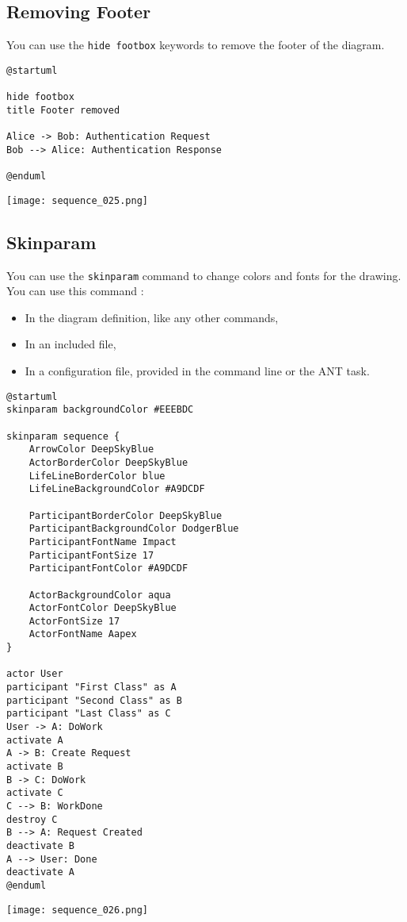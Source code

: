 \newpage \subsection{Removing Footer}

You can use the \texttt{hide footbox} keywords to remove the footer of the
diagram.
\begin{lstlisting}
@startuml

hide footbox
title Footer removed

Alice -> Bob: Authentication Request
Bob --> Alice: Authentication Response

@enduml
\end{lstlisting}
\begin{center}
\texttt{[image: sequence\_025.png]}
\end{center}


\newpage \subsection{Skinparam}

You can use the \texttt{skinparam} command to change colors and fonts for the drawing.
You can use this command :

\begin{itemize}
\item In the diagram definition, like any other commands,
\item In an included file,
\item In a configuration file, provided in the command line or the ANT task.
\end{itemize}

\begin{lstlisting}
@startuml
skinparam backgroundColor #EEEBDC

skinparam sequence {
	ArrowColor DeepSkyBlue
	ActorBorderColor DeepSkyBlue
	LifeLineBorderColor blue
	LifeLineBackgroundColor #A9DCDF
	
	ParticipantBorderColor DeepSkyBlue
	ParticipantBackgroundColor DodgerBlue
	ParticipantFontName Impact
	ParticipantFontSize 17
	ParticipantFontColor #A9DCDF
	
	ActorBackgroundColor aqua
	ActorFontColor DeepSkyBlue
	ActorFontSize 17
	ActorFontName Aapex
}

actor User
participant "First Class" as A
participant "Second Class" as B
participant "Last Class" as C
User -> A: DoWork
activate A
A -> B: Create Request
activate B
B -> C: DoWork
activate C
C --> B: WorkDone
destroy C
B --> A: Request Created
deactivate B
A --> User: Done
deactivate A
@enduml
\end{lstlisting}
\begin{center}
\texttt{[image: sequence\_026.png]}
\end{center}

